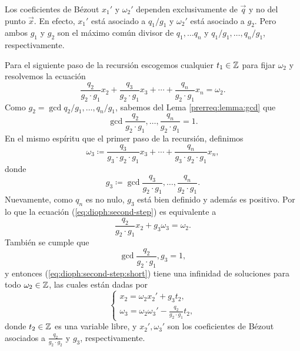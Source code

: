 \begin{observation}
	Los coeficientes de Bézout $x_1'$ y $\omega_2'$ dependen exclusivamente de $\vec{q}$ y no del
	punto $\vec{x}$. En efecto, $x_1'$ está asociado a $q_1/g_1$ y $\omega_2'$ está asociado a
	$g_2$. Pero ambos $g_1$ y $g_2$ son el máximo común divisor de $q_1, \ldots q_n$ y
	$q_1/g_1, \ldots, q_n/g_1$, respectivamente. 
\end{observation}

Para el siguiente paso de la recursión escogemos cualquier $t_1 \in \mathbb{Z}$ para fijar $\omega_2$  y
resolvemos la ecuación
\begin{equation}
	\label{eq:dioph:second-step}
	\frac{q_2}{g_2 \cdot g_1}x_2 +
	\frac{q_3}{g_2 \cdot g_1}x_3 +
	\cdots +
	\frac{q_n}{g_2 \cdot g_1}x_n
	= \omega_2.
\end{equation}
Como $g_2 = \gcd{q_2/g_1, \ldots, q_n/g_1}$, sabemos del Lema \ref{prerreq:lemma:gcd}
que
\begin{equation*}
	\gcd{\frac{q_2}{g_2 \cdot g_1}, \ldots, \frac{q_n}{g_2 \cdot g_1}} = 1.
\end{equation*}
En el mismo espíritu que el primer paso de la recursión, definimos
\begin{equation*}
	\omega_3 \coloneq \frac{q_3}{g_3 \cdot g_2 \cdot g_1}x_3 + \cdots + \frac{q_n}{g_3
	\cdot g_2 \cdot g_1}x_n,
\end{equation*}
donde
\begin{equation*}
	g_3 \coloneq  \gcd{\frac{q_3}{g_2 \cdot g_1}, \ldots, \frac{q_n}{g_2 \cdot g_1}}.
\end{equation*}
Nuevamente, como $q_n$ es no nulo, $g_3$ está bien definido y además es positivo. Por lo que la
ecuación (\ref{eq:dioph:second-step}) es equivalente a
\begin{equation}
	\label{eq:dioph:second-step:short}
	\frac{q_2}{g_2 \cdot g_1}x_2 + g_3\omega_3 = \omega_2.
\end{equation}
También se cumple que
\begin{equation*}
	\gcd{\frac{q_2}{g_2 \cdot g_1}, g_3} = 1,
\end{equation*}
y entonces (\ref{eq:dioph:second-step:short}) tiene una infinidad de soluciones para todo $\omega_2 \in
\mathbb{Z}$, las cuales están dadas por
\begin{equation*}
	\begin{cases}
		x_2 = \omega_2x_2' + g_3t_2, \\
		\omega_3 = \omega_2\omega_3' - \frac{q_2}{g_2 \cdot g_1}t_2,
	\end{cases}
\end{equation*}
donde $t_2 \in \mathbb{Z}$ es una variable libre, y $x_2', \omega_3'$ son los coeficientes de Bézout
asociados a $\frac{q_2}{g_2 \cdot g_2}$ y $g_3$, respectivamente.

